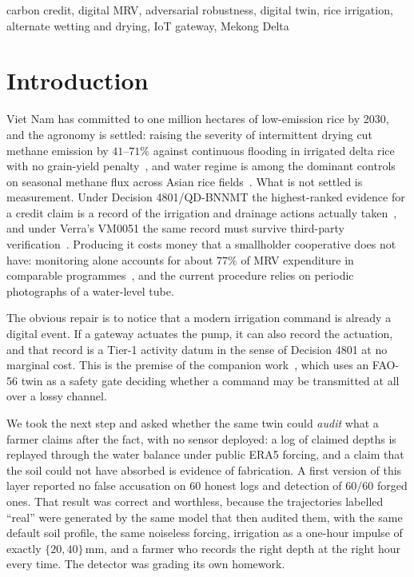 \documentclass[journal]{IEEEtran}
\begin{document}
\begin{IEEEkeywords}
carbon credit, digital MRV, adversarial robustness, digital twin, rice irrigation,
alternate wetting and drying, IoT gateway, Mekong Delta
\end{IEEEkeywords}
\section{Introduction}
\label{sec:intro}

Viet Nam has committed to one million hectares of low-emission rice by 2030, and
the agronomy is settled: raising the severity of intermittent drying cut methane
emission by $41$--$71\%$ against continuous flooding in irrigated delta rice
with no grain-yield penalty~\cite{balaine2019}, and water regime is among the
dominant controls on seasonal methane flux across Asian rice
fields~\cite{yan2005}. What is not settled is measurement. Under
Decision 4801/QD-BNNMT the highest-ranked evidence for a credit claim is a record
of the irrigation and drainage actions actually taken~\cite{qd4801}, and under
Verra's VM0051 the same record must survive third-party
verification~\cite{vm0051}. Producing it costs money that a smallholder
cooperative does not have: monitoring alone accounts for about $77\%$ of MRV
expenditure in comparable programmes~\cite{jem2026mrv}, and the current procedure
relies on periodic photographs of a water-level tube.

The obvious repair is to notice that a modern irrigation command is already a
digital event. If a gateway actuates the pump, it can also record the actuation,
and that record is a Tier-1 activity datum in the sense of Decision 4801 at no
marginal cost. This is the premise of the companion work~\cite{twingate2026},
which uses an FAO-56 twin as a safety gate deciding whether a command may be
transmitted at all over a lossy channel.

We took the next step and asked whether the same twin could \emph{audit} what a
farmer claims after the fact, with no sensor deployed: a log of claimed depths is
replayed through the water balance under public ERA5 forcing, and a claim that the
soil could not have absorbed is evidence of fabrication. A first version of this
layer reported no false accusation on $60$ honest logs and detection of $60/60$
forged ones. That result was correct and worthless, because the trajectories
labelled ``real'' were generated by the same model that then audited them, with
the same default soil profile, the same noiseless forcing, irrigation as a
one-hour impulse of exactly $\{20,40\}$\,mm, and a farmer who records the right
depth at the right hour every time. The detector was grading its own homework.
\end{document}

